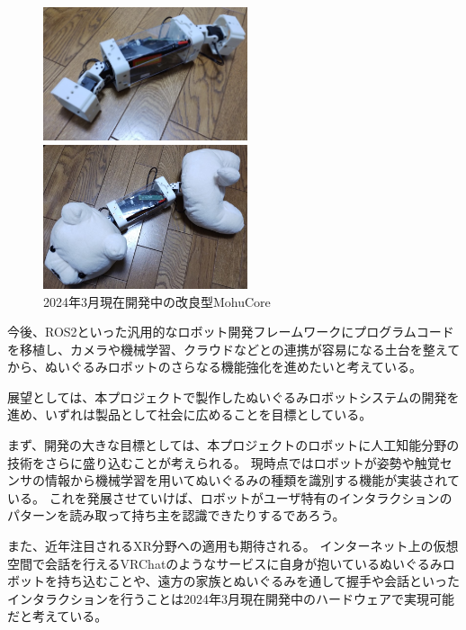 \documentclass[uplatex,a4paper,12pt]{jsarticle}
\begin{document}
\begin{figure}[htbp]
  \centering
  \begin{minipage}[c]{0.48\linewidth}
    \centering
    \includegraphics[keepaspectratio,width=6cm,clip]{images/prototype/prototype_04_01.jpg}
  \end{minipage}
  \begin{minipage}[c]{0.48\linewidth}
    \centering
    \includegraphics[keepaspectratio,width=6cm,clip]{images/prototype/prototype_04_02.jpg}
  \end{minipage}
  \caption{2024年3月現在開発中の改良型MohuCore}
  \label{fig:prototype_04}
\end{figure}

今後、ROS2といった汎用的なロボット開発フレームワークにプログラムコードを移植し、カメラや機械学習、クラウドなどとの連携が容易になる土台を整えてから、ぬいぐるみロボットのさらなる機能強化を進めたいと考えている。

展望としては、本プロジェクトで製作したぬいぐるみロボットシステムの開発を進め、いずれは製品として社会に広めることを目標としている。

まず、開発の大きな目標としては、本プロジェクトのロボットに人工知能分野の技術をさらに盛り込むことが考えられる。
現時点ではロボットが姿勢や触覚センサの情報から機械学習を用いてぬいぐるみの種類を識別する機能が実装されている。
これを発展させていけば、ロボットがユーザ特有のインタラクションのパターンを読み取って持ち主を認識できたりするであろう。

また、近年注目されるXR分野への適用も期待される。
インターネット上の仮想空間で会話を行えるVRChatのようなサービスに自身が抱いているぬいぐるみロボットを持ち込むことや、遠方の家族とぬいぐるみを通して握手や会話といったインタラクションを行うことは2024年3月現在開発中のハードウェアで実現可能だと考えている。
\end{document}
